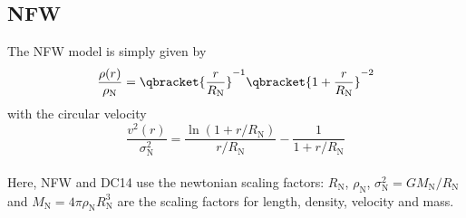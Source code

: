 \subsection{NFW}
\noindent The NFW model is simply given by \citep{1996ApJ...462..563N} \begin{equation}
	\frac{\rho(r)}{\rho_\mathrm{N}} = \qbracket{\frac{r}{R_\mathrm{N}}}^{-1}\qbracket{1 + \frac{r}{R_\mathrm{N}}}^{-2}
\end{equation} with the circular velocity \begin{equation}
	\frac{v^2(r)}{\sigma_\mathrm{N}^2} = \frac{\ln(1 + r/R_\mathrm{N})}{r/R_\mathrm{N}} - \frac{1}{1 + r/R_\mathrm{N}}
\end{equation}\\

\noindent Here, NFW and DC14 use the newtonian scaling factors: $R_\mathrm{N}$, $\rho_\mathrm{N}$, $\sigma_\mathrm{N}^2 = G M_\mathrm{N}/R_\mathrm{N}$ and $M_\mathrm{N} = 4\pi \rho_\mathrm{N} R_\mathrm{N}^3$ are the scaling factors for length, density, velocity and mass.